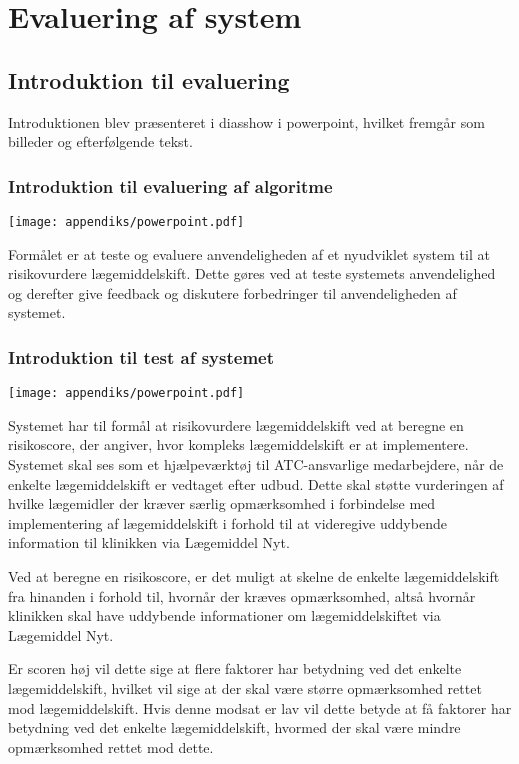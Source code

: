 \chapter{Evaluering af system} \vspace{-1cm}
\section{Introduktion til evaluering} \label{App:Intro}
Introduktionen blev præsenteret i diasshow i powerpoint, hvilket fremgår som billeder og efterfølgende tekst.

\subsection{Introduktion til evaluering af algoritme}  \vspace{-0.3cm}
 \texttt{[image: appendiks/powerpoint.pdf]} \\ \vspace{-3cm} 
  
Formålet er at teste og evaluere anvendeligheden af et nyudviklet system til at risikovurdere lægemiddelskift. Dette gøres ved at teste systemets anvendelighed og derefter give feedback og diskutere forbedringer til anvendeligheden af systemet.

\subsection{Introduktion til test af systemet} \vspace{-0.3cm}
\texttt{[image: appendiks/powerpoint.pdf]} 

Systemet har til formål at risikovurdere lægemiddelskift ved at beregne en risikoscore, der angiver, hvor kompleks lægemiddelskift er at implementere. Systemet skal ses som et hjælpeværktøj til ATC-ansvarlige medarbejdere, når de enkelte lægemiddelskift er vedtaget efter udbud.  Dette skal støtte vurderingen af hvilke lægemidler der kræver særlig opmærksomhed i forbindelse med implementering af lægemiddelskift i forhold til at videregive uddybende information til klinikken via Lægemiddel Nyt. 

Ved at beregne en risikoscore, er det muligt at skelne de enkelte lægemiddelskift fra hinanden i forhold til, hvornår der kræves opmærksomhed, altså hvornår klinikken skal have uddybende informationer om lægemiddelskiftet via Lægemiddel Nyt.

Er scoren høj vil dette sige at flere faktorer har betydning ved det enkelte lægemiddelskift, hvilket vil sige at der skal være større opmærksomhed rettet mod lægemiddelskift. Hvis denne modsat er lav vil dette betyde at få faktorer har betydning ved det enkelte lægemiddelskift, hvormed der skal være mindre opmærksomhed rettet mod dette.

